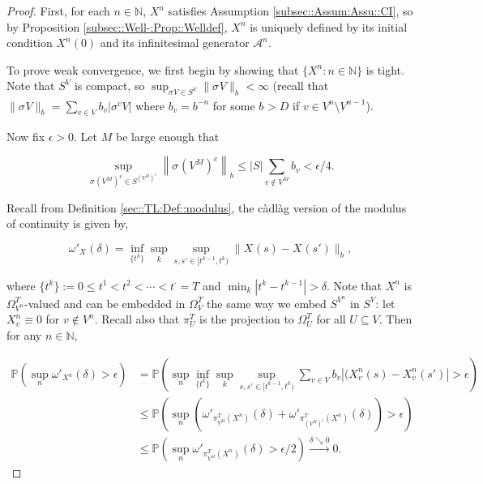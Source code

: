 \documentclass[12pt]{article}
\newcommand{\mb}{\mathbb}
\newcommand{\mc}{\mathcal}
\newcommand{\ra}{\rightarrow}
\newcommand{\os}{\overset}
\newcommand{\ep}{\epsilon}
\newcommand{\ind}{\hspace{24pt}}
\newcommand{\pr}{\mb{P}}							%
\renewcommand{\v}{v}							%
\renewcommand{\U}{U}							%
\renewcommand{\S}{S}							%
\newcommand{\s}{\sigma}							%
\newcommand{\sv}[1]{\s^{#1}}					%
\renewcommand{\b}[1]{b_{#1}}					%
\newcommand{\T}{T}								%
\newcommand{\OmegaV}[2]{\Omega_{#1}^{#2}}		%
\renewcommand{\t}{t}							%
\newcommand{\degr}{D}								%
\newcommand{\IG}{\mc{A}}						%
\newcommand{\pup}[1]{^{#1}}							%
\newcommand{\V}{V}									%
\renewcommand{\tt}{s}								%
\newcommand{\ttt}{s'}								%
\renewcommand{\it}{k}								%
\newcommand{\numb}{n}								%
\newcommand{\XState}[1]{\S^{#1}}				%
\newcommand{\piV}[2]{\pi_{#1}^{#2}}					%
\newcommand{\rxvt}[2]{X_{#1}{(#2)}}					%
\newcommand{\rxvtn}[3]{X_{#1}^{#3}(#2)}				%
\newcommand{\rxvts}[2]{X_{#1}{#2}}					%
\newcommand{\rxvtsn}[3]{X_{#1}^{#3}{#2}}			%
\begin{document}
\begin{proof}
First, for each \(\numb\in\mb{N}\), \(\rxvtsn{}{}{\numb}\) satisfies Assumption \ref{subsec::Assum:Assu::CI}, so by Proposition \ref{subsec::Well-:Prop::Welldef}, \(\rxvtsn{}{}{\numb}\) is uniquely defined by its initial condition \(\rxvtn{}{0}{\numb}\) and its infinitesimal generator \(\IG\pup{\numb}\).

\ind To prove weak convergence, we first begin by showing that \(\{\rxvtsn{}{}{\numb}:\numb\in \mb{N}\}\) is tight. Note that \(\S^\V\) is compact, so \(\sup_{\sv{}{\V} \in \S^\V} \|\sv{}{\V}\|_{\b{}} < \infty\) (recall that \(\|\sv{}{\V}\|_{\b{}} = \sum_{\v \in \V} \b{\v} |\sv{\v}{\V}|\) where \(\b{\v} = \b{}^{-\numb}\) for some \(\b{} > \degr\) if \(\v \in \V\pup{\numb}\setminus \V\pup{\numb-1}\)).

\ind Now fix \(\ep > 0\). Let \(M\) be large enough that

\[\sup_{\sv{}{\left(\V\pup{M}\right)^c} \in \S^{\left(\V\pup{M}\right)^c}} \left\|\sv{}{\left(\V\pup{M}\right)^c}\right\|_{\b{}} \leq |\S|\sum_{\v \notin \V\pup{M}} \b{\v} < \ep/4.\]

Recall from Definition \ref{sec::TL:Def::modulus}, the c\`adl\`ag version of the modulus of continuity is given by,

\[\omega'_{\rxvts{}{}}(\delta) = \inf_{\{\t\pup{\it}\}} \sup_\it \sup_{\tt,\ttt \in [\t\pup{\it-1},\t\pup{\it})} \|\rxvt{}{\tt} - \rxvt{}{\ttt}\|_{\b{}},\]

where \(\{\t\pup{\it}\} := 0 \leq \t\pup{1} < \t\pup{2} < \cdots < \t\pup{\cdot} = \T\) and \(\min_\it|\t\pup{\it} - \t\pup{\it-1}| > \delta\). Note that \(\rxvtsn{}{}{\numb}\) is \(\OmegaV{\V\pup{\numb}}{\T}\)-valued and can be embedded in \(\OmegaV{\V}{\T}\) the same way we embed \(\S^{\V\pup{\numb}}\) in \(\S^\V\): let \(\rxvtsn{\v}{}{\numb} \equiv 0\) for \(\v \notin \V\pup{\numb}\). Recall also that \(\piV{\U}{\T}\) is the projection to \(\OmegaV{\U}{\T}\) for all \(\U\subseteq \V\). Then for any \(\numb\in \mb{N}\),

\begin{align*}
\pr\left(\sup_\numb \omega'_{\rxvtsn{}{}{\numb}}(\delta) > \epsilon\right) &= \pr\left(\sup_\numb\inf_{\{\t\pup{\it}\}}\sup_\it\sup_{\tt,\ttt \in [\t\pup{\it-1},\t\pup{\it})} \sum_{\v \in \V} \b{\v}|(\rxvtn{\v}{\tt}{\numb} - \rxvtn{\v}{\ttt}{\numb}| > \epsilon \right)\\
&\leq \pr\left(\sup_\numb \left(\omega'_{\piV{\V\pup{M}}{\T}(\rxvtsn{}{}{\numb})}(\delta) + \omega'_{\piV{\left(\V\pup{M}\right)^c}{\T}(\rxvtsn{}{}{\numb})}(\delta)\right) > \ep\right)\\
&\leq \pr\left(\sup_\numb \omega'_{\piV{\V\pup{M}}{\T}(\rxvtsn{}{}{\numb})}(\delta) > \ep/2\right) \os{\delta\searrow 0}{\ra} 0.
\end{align*}


\end{proof}
\end{document}
